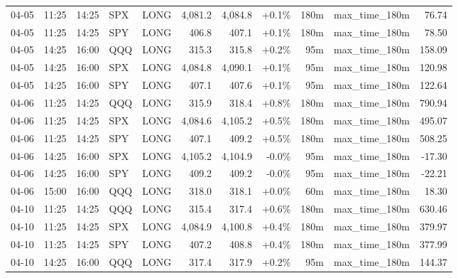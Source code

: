 \documentclass[11pt,a4paper,twoside]{article}
\begin{document}
\begin{center}
\begin{longtable}{>{\color{txtmain}}l l l l l r r r r >{\color{txtmain}}l r}
04-05 & 11:25 & 14:25 & SPX & LONG & 4,081.2 & 4,084.8 & \textcolor{wingreen}{+0.1\%} & 180m & max\_time\_180m & \textcolor{wingreen}{76.74} \\
04-05 & 11:25 & 14:25 & SPY & LONG & 406.8 & 407.1 & \textcolor{wingreen}{+0.1\%} & 180m & max\_time\_180m & \textcolor{wingreen}{78.50} \\
04-05 & 14:25 & 16:00 & QQQ & LONG & 315.3 & 315.8 & \textcolor{wingreen}{+0.2\%} & 95m & max\_time\_180m & \textcolor{wingreen}{158.09} \\
04-05 & 14:25 & 16:00 & SPX & LONG & 4,084.8 & 4,090.1 & \textcolor{wingreen}{+0.1\%} & 95m & max\_time\_180m & \textcolor{wingreen}{120.98} \\
04-05 & 14:25 & 16:00 & SPY & LONG & 407.1 & 407.6 & \textcolor{wingreen}{+0.1\%} & 95m & max\_time\_180m & \textcolor{wingreen}{122.64} \\
04-06 & 11:25 & 14:25 & QQQ & LONG & 315.9 & 318.4 & \textcolor{wingreen}{+0.8\%} & 180m & max\_time\_180m & \textcolor{wingreen}{790.94} \\
04-06 & 11:25 & 14:25 & SPX & LONG & 4,084.6 & 4,105.2 & \textcolor{wingreen}{+0.5\%} & 180m & max\_time\_180m & \textcolor{wingreen}{495.07} \\
04-06 & 11:25 & 14:25 & SPY & LONG & 407.1 & 409.2 & \textcolor{wingreen}{+0.5\%} & 180m & max\_time\_180m & \textcolor{wingreen}{508.25} \\
04-06 & 14:25 & 16:00 & SPX & LONG & 4,105.2 & 4,104.9 & \textcolor{lossred}{-0.0\%} & 95m & max\_time\_180m & \textcolor{lossred}{-17.30} \\
04-06 & 14:25 & 16:00 & SPY & LONG & 409.2 & 409.2 & \textcolor{lossred}{-0.0\%} & 95m & max\_time\_180m & \textcolor{lossred}{-22.21} \\
04-06 & 15:00 & 16:00 & QQQ & LONG & 318.0 & 318.1 & \textcolor{wingreen}{+0.0\%} & 60m & max\_time\_180m & \textcolor{wingreen}{18.30} \\
04-10 & 11:25 & 14:25 & QQQ & LONG & 315.4 & 317.4 & \textcolor{wingreen}{+0.6\%} & 180m & max\_time\_180m & \textcolor{wingreen}{630.46} \\
04-10 & 11:25 & 14:25 & SPX & LONG & 4,084.9 & 4,100.8 & \textcolor{wingreen}{+0.4\%} & 180m & max\_time\_180m & \textcolor{wingreen}{379.97} \\
04-10 & 11:25 & 14:25 & SPY & LONG & 407.2 & 408.8 & \textcolor{wingreen}{+0.4\%} & 180m & max\_time\_180m & \textcolor{wingreen}{377.99} \\
04-10 & 14:25 & 16:00 & QQQ & LONG & 317.4 & 317.9 & \textcolor{wingreen}{+0.2\%} & 95m & max\_time\_180m & \textcolor{wingreen}{144.37} \\

\end{longtable}
\end{center}
\end{document}
